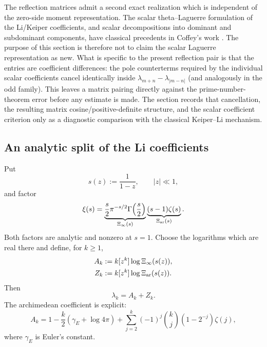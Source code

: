 \documentclass[11pt]{amsart}
\numberwithin{equation}{section}
\theoremstyle{plain}
\theoremstyle{definition}
\theoremstyle{remark}
\begin{document}
The reflection matrices admit a second exact realization which is independent of the zero-side moment representation.  The scalar theta--Laguerre formulation of the Li/Keiper coefficients, and scalar decompositions into dominant and subdominant components, have classical precedents in Coffey's work \cite{Coffey2007ThetaLaguerre,Coffey2010Polygamma}.  The purpose of this section is therefore not to claim the scalar Laguerre representation as new.  What is specific to the present reflection pair is that the entries are coefficient differences: the pole counterterms required by the individual scalar coefficients cancel identically inside $\lambda_{m+n}-\lambda_{|m-n|}$ (and analogously in the odd family).  This leaves a matrix pairing directly against the prime-number-theorem error before any estimate is made.  The section records that cancellation, the resulting matrix cosine/positive-definite structure, and the scalar coefficient criterion only as a diagnostic comparison with the classical Keiper--Li mechanism.

\subsection{An analytic split of the Li coefficients}

Put
\begin{equation}
 s(z):=\frac{1}{1-z},
 \qquad |z|\ll1,
 \label{eq:laguerre_cayley_s}
\end{equation}
and factor
\begin{equation}
 \xi(s)=
 \underbrace{\frac{s}{2}\pi^{-s/2}\Gamma\!\left(\frac{s}{2}\right)}_{\Xi_\infty(s)}
 \underbrace{(s-1)\zeta(s)}_{\Xi_{\rm ar}(s)}.
 \label{eq:xi_arch_arith_factorization}
\end{equation}
Both factors are analytic and nonzero at $s=1$.  Choose the logarithms which are real there and define, for $k\ge1$,
\begin{align}
 A_k&:=k[z^k]\log \Xi_\infty(s(z)),
 \label{eq:Ak_definition}\\
 Z_k&:=k[z^k]\log \Xi_{\rm ar}(s(z)).
 \label{eq:Zk_definition}
\end{align}
Then
\begin{equation}
 \lambda_k=A_k+Z_k.
 \label{eq:lambda_arch_arith_split}
\end{equation}
The archimedean coefficient is explicit:
\begin{equation}
 A_k=
 1-\frac{k}{2}(\gamma_E+\log 4\pi)
 +\sum_{j=2}^{k}(-1)^j\binom{k}{j}(1-2^{-j})\zeta(j),
 \label{eq:Ak_closed_form}
\end{equation}
where $\gamma_E$ is Euler's constant.
\end{document}

